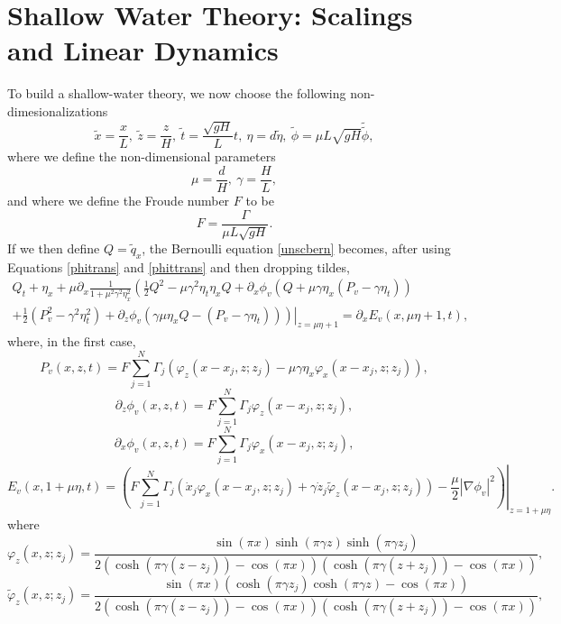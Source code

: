 \documentclass[a4paper,11pt]{article}
\newcommand{\p}{\partial}
\begin{document}
\section{Shallow Water Theory: Scalings and Linear Dynamics}
To build a shallow-water theory, we now choose the following non-dimesionalizations 
\[
\tilde{x} = \frac{x}{L}, ~\tilde{z} = \frac{z}{H}, ~ \tilde{t} = \frac{\sqrt{gH}}{L} t, ~ \eta = d\tilde{\eta}, ~ \tilde{\phi} = \mu L\sqrt{gH} \tilde{\tilde{\phi}},
\]
where we define the non-dimensional parameters
\[
\mu= \frac{d}{H}, ~ \gamma = \frac{H}{L},
\]
and where we define the Froude number $F$ to be 
\[
F = \frac{\Gamma}{\mu L \sqrt{gH}}.
\]
If we then define $Q = \tilde{q}_{x}$, the Bernoulli equation \eqref{unscbern} becomes, after using Equations \eqref{phitrans} and \eqref{phittrans} and then dropping tildes,  
\begin{align*}
Q_{t} + \eta_{x} + \mu\p_{x}\frac{1}{1+ \mu^{2}\gamma^{2}\eta_{x}^{2}} \left( \frac{1}{2}Q^{2} - \mu \gamma^{2}\eta_{t}\eta_{x}Q  +  \p_{x}\phi_{v} (Q + \mu\gamma\eta_{x}( P_{v}-\gamma\eta_{t}))   \right. \\
\left.\left. + \frac{1}{2}\left(P_{v}^{2}-\gamma^{2}\eta_{t}^{2} \right)+ \p_{z}\phi_{v}\left(\gamma \mu \eta_{x}Q-\left(P_{v}-\gamma \eta_{t}\right) \right) \right)\right|_{z=\mu\eta+1}= \p_{x}E_{v}(x,\mu\eta+1,t),
\end{align*}
where, in the first case,
\[
P_{v}(x,z,t) = F\sum_{j=1}^{N} \Gamma_{j} \left(\varphi_{z}(x-x_{j},z;z_{j})-\mu\gamma \eta_{x}\varphi_{x}(x-x_{j},z;z_{j}) \right),
\]
\[
\p_{z}\phi_{v}(x,z,t) =  F\sum_{j=1}^{N} \Gamma_{j}\varphi_{z}(x-x_{j},z;z_{j}),
\]
\[
\p_{x}\phi_{v}(x,z,t) = F\sum_{j=1}^{N}\Gamma_{j}\varphi_{x}(x-x_{j},z;z_{j}),
\]
\[
E_{v}(x,1+\mu\eta,t) = \left.\left(F\sum_{j=1}^{N}\Gamma_{j}\left(\dot{x}_{j}\varphi_{x}(x-x_{j},z;z_{j}) + \gamma\dot{z}_{j}\tilde{\varphi}_{z}(x-x_{j},z;z_{j}) \right) -\frac{\mu}{2}\left|\nabla\phi_{v} \right|^{2}\right)\right|_{z=1+\mu \eta}.
\]
where
\[
\varphi_{z}(x,z;z_{j}) = \frac{\sin(\pi x)\sinh(\pi \gamma z)\sinh(\pi \gamma z_{j})}{2\left(\cosh(\pi\gamma(z-z_{j}))-\cos(\pi x)\right) \left(\cosh(\pi\gamma(z+z_{j}))-\cos(\pi x)\right)},
\]
\[
\tilde{\varphi}_{z}(x,z;z_{j}) = \frac{\sin(\pi x)\left(\cosh(\pi \gamma z_{j})\cosh(\pi \gamma z)-\cos(\pi x)\right)}{2\left(\cosh(\pi\gamma(z-z_{j}))-\cos(\pi x)\right) \left(\cosh(\pi\gamma(z+z_{j}))-\cos(\pi x)\right)},
\]
\end{document}
